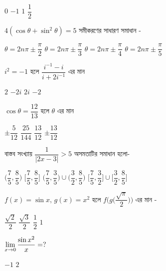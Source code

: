 \documentclass[addpoints]{exam}
\begin{document}
\begin{questions}
\begin{oneparchoices}
\choice $ 0 $
\choice $ -1 $
\choice $ 1 $
\choice $ \dfrac{1}{2} $
\end{oneparchoices}

\question $ 4(\cos\theta +\sin^{2}\theta) =5 $ সমীকরণের সাধারণ সমাধান -

\begin{oneparchoices}
\choice $ \theta = 2n\pi \pm \dfrac{\pi}{2} $
\choice $ \theta = 2n\pi \pm \dfrac{\pi}{3} $
\choice $ \theta = 2n\pi \pm \dfrac{\pi}{4} $
\choice $ \theta = 2n\pi \pm \dfrac{\pi}{5} $
\end{oneparchoices}

\question $ i^{2}=-1 $ হলে $ \dfrac{i^{-1}-i}{i+2i^{-1}} $ এর মান

\begin{oneparchoices}
\choice $ 2 $
\choice $ -2i $
\choice $ 2i $
\choice  $ -2 $
\end{oneparchoices}

\question $ \cos\theta = \dfrac{12}{13} $ হলে $ \theta $ এর মান

\begin{oneparchoices}
\choice $ \pm \dfrac{5}{12} $
\choice $  \dfrac{25}{144} $
\choice $ \dfrac{13}{12} $
\choice  $ \pm \dfrac{13}{12} $
\end{oneparchoices}

\question   বাস্তব সংখ্যায় $ \dfrac{1}{|2x-3|}> 5 $ অসমতাটির সমাধান হলো-

\begin{oneparchoices}
\choice $ \Big(\dfrac{7}{5}, \dfrac{8}{5}\Big)$
\choice $ \Big[\dfrac{7}{5}, \dfrac{8}{5}\Big]$
\choice $ \Big(\dfrac{7}{5}, \dfrac{3}{5}\Big)\cup \Big(\dfrac{3}{2}, \dfrac{8}{5}\Big)  $
\choice $ \Big[\dfrac{7}{5}, \dfrac{3}{2}\Big]\cup \Big[\dfrac{3}{2}, \dfrac{8}{5}\Big]  $
\end{oneparchoices}

\question $ f(x) = \sin x,\, g(x)=x^{2} $ হলে $ f\Big(g\Big(\dfrac{\sqrt{\pi}}{2}\Big) \Big) $ এর মান - 

\begin{oneparchoices}
\choice $ \dfrac{\sqrt{2}}{2} $
\choice $  \dfrac{\sqrt{3}}{2} $
\choice $ \dfrac{1}{2} $
\choice  $ 1 $
\end{oneparchoices}

\question  $ \mathlarger{\lim_{x\to 0} \dfrac{\sin x^{2}}{x}}=? $ 

\begin{oneparchoices}
\choice $ -1 $
\choice $ 2 $
\end{oneparchoices}


\end{questions}
\end{document}
